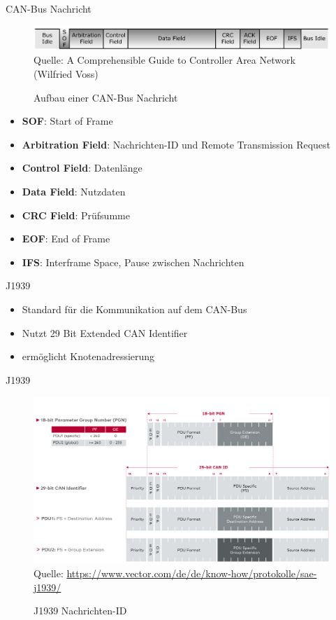 \documentclass[usenames, dvipsnames, aspectratio=75]{beamer}
\begin{document}
\begin{frame}{CAN-Bus Nachricht}
    \begin{figure}
        \centering
        \includegraphics[width=0.9\linewidth]{assets/canMessage.png}
        \tiny{Quelle: A Comprehensible Guide to Controller Area Network (Wilfried Voss)}
        \caption{Aufbau einer CAN-Bus Nachricht}
    \end{figure}
    \begin{itemize}
        \item \textbf{SOF}: Start of Frame
        \item \textbf{Arbitration Field}: Nachrichten-ID und Remote Transmission Request
        \item \textbf{Control Field}: Datenlänge
        \item \textbf{Data Field}: Nutzdaten
        \item \textbf{CRC Field}: Prüfsumme
        \item \textbf{EOF}: End of Frame
        \item \textbf{IFS}: Interframe Space, Pause zwischen Nachrichten
    \end{itemize}
\end{frame}

\begin{frame}{J1939}
    \begin{itemize}
        \item Standard für die Kommunikation auf dem CAN-Bus
        \item Nutzt 29 Bit Extended CAN Identifier
        \item ermöglicht Knotenadressierung
    \end{itemize}
\end{frame}

\begin{frame}{J1939}
    \begin{figure}
        \centering
        \includegraphics[width=1\linewidth]{assets/j1939id.png}
        \tiny{Quelle: \url{https://www.vector.com/de/de/know-how/protokolle/sae-j1939/}}
        \caption{J1939 Nachrichten-ID}
    \end{figure}
\end{frame}
\end{document}
